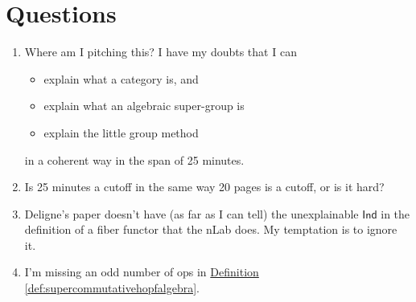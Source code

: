 \documentclass[a4paper,10pt]{scrreprt}
\theoremstyle{definition}
\theoremstyle{plain}
\theoremstyle{remark}
\begin{document}
\chapter{Questions}
\begin{enumerate}
  \item Where am I pitching this? I have my doubts that I can 
    \begin{itemize}
      \item explain what a category is, and
      \item explain what an algebraic super-group is
      \item explain the little group method
    \end{itemize}
    in a coherent way in the span of 25 minutes.

  \item Is 25 minutes a cutoff in the same way 20 pages is a cutoff, or is it hard?

  \item Deligne's paper doesn't have (as far as I can tell) the unexplainable $\mathsf{Ind}$ in the definition of a fiber functor that the nLab does. My temptation is to ignore it.

  \item I'm missing an odd number of $\text{op}$s in \hyperref[def:supercommutativehopfalgebra]{Definition \ref*{def:supercommutativehopfalgebra}}.
\end{enumerate}
\end{document}
